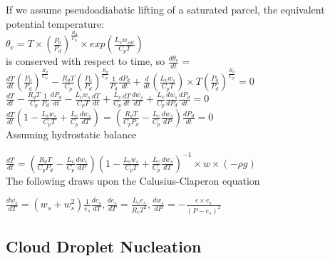 \documentclass[11pt]{article} %
\begin{document}
If we assume pseudoadiabatic lifting of a saturated parcel, the equivalent potential temperature:\\

$\theta_{e} = T \times (\frac{P_{0}}{P_{d}})^{\frac{R_{d}}{C_{p}}}\times exp(\frac{L_{v}w_{sat}}{C_{p}T})$\\

is conserved with respect to time, so $\frac{d \theta_{e}}{dt} = $\\

$\frac{dT}{dt}(\frac{P_{0}}{P_{d}})^{\frac{R_{d}}{C_{p}}}  - \frac{R_{d}T}{C_{p}}(\frac{P_{0}}{P_{d}})^{\frac{R_{d}}{C_{p}}}\frac{1}{P_{d}}\frac{dP_{d}}{dt} + \frac{d}{dt} (\frac{L_{v}w_{s}}{C_{p}T}) \times T(\frac{P_{0}}{P_{d}})^{\frac{R_{d}}{C_{p}}} = 0$\\

$\frac{dT}{dt}  - \frac{R_{d}T}{C_{p}}\frac{1}{P_{d}}\frac{dP_{d}}{dt} - \frac{L_{v}w_{s}}{C_{p}T}\frac{dT}{dt} + \frac{L_{v}}{C_{p}}\frac{dT}{dt}\frac{dw_{s}}{dT}+ \frac{L_{v}}{C_{p}}\frac{dw_{s}}{dP_{d}}\frac{dP_{d}}{dt} = 0$\\

$\frac{dT}{dt}(1 - \frac{L_{v}w_{s}}{C_{p}T} + \frac{L_{v}}{C_{p}}\frac{dw_{s}}{dT}) = (\frac{R_{d}T}{C_{p}P_{d}} - \frac{L_{v}}{C_{p}}\frac{dw_{s}}{dP})\frac{dP_{d}}{dt} = 0$\\

Assuming hydrostatic balance

$\frac{dT}{dt} = (\frac{R_{d}T}{C_{p}P_{d}} - \frac{L_{v}}{C_{p}}\frac{dw_{s}}{dP})(1 - \frac{L_{v}w_{s}}{C_{p}T} + \frac{L_{v}}{C_{p}}\frac{dw_{s}}{dT})^{-1} \times w \times (-\rho g)$\\

The following draws upon the Calusius-Claperon equation

$\frac{dw_{s}}{dT} = (w_{s} + w_{s}^{2})\frac{1}{e_{s}}\frac{de_{s}}{dT}, \frac{de_{s}}{dT} = \frac{L_{v} e_{s}}{R_{v}T^{2}}, \frac{dw_{s}}{dP} = -\frac{\epsilon \times e_{s}}{(P - e_{s})^{2}}$ \\

\subsection{Cloud Droplet Nucleation}
\end{document}
